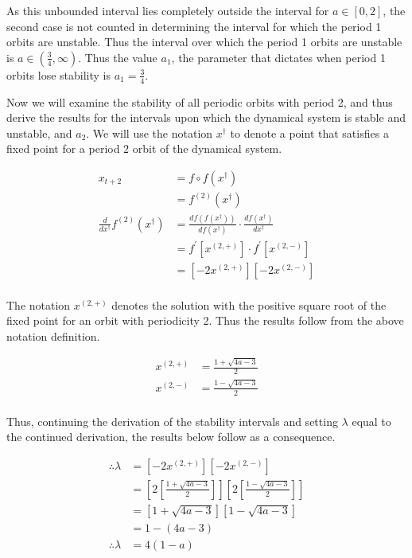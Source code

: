 \documentclass[a4paper]{article}
\begin{document}
\begin{enumerate}[label=\textbf{\arabic*.}]
\begin{enumerate}
		As this unbounded interval lies completely outside the interval for $\displaystyle{a \in [0,2]}$, the second case is not counted in determining the interval for which the period 1 orbits are unstable. Thus the interval over which the period 1 orbits are unstable is $\displaystyle{a \in \left(\frac{3}{4},\infty \right)}$. Thus the value $a_1$, the parameter that dictates when period 1 orbits lose stability is $a_1 = \frac{3}{4}$.

		\pagebreak

		Now we will examine the stability of all periodic orbits with period 2, and thus derive the results for the intervals upon which the dynamical system is stable and unstable, and $a_2$. We will use the notation $x^{\dagger}$ to denote a point that satisfies a fixed point for a period 2 orbit of the dynamical system.

		\begin{align*}
		x_{t+2} & = f\circ f(x^{\dagger})\\
		& = f^{(2)}(x^{\dagger})\\
		\frac{d}{dx^{\dagger}}f^{(2)}(x^{\dagger}) & = \frac{df(f(x^{\dagger}))}{df(x^{\dagger})}\cdot \frac{df(x^{\dagger})}{dx^{\dagger}}\\
		& = f^\prime \left[x^{(2,+)} \right] \cdot f^\prime \left[x^{(2,-)} \right]\\
		& = \left[-2x^{(2,+)} \right] \left[-2x^{(2,-)} \right]\\
		\end{align*}

		The notation $\displaystyle{x^{(2,+)}}$ denotes the solution with the positive square root of the fixed point for an orbit with periodicity 2. Thus the results follow from the above notation definition.

		\begin{align*}
		x^{(2,+)} & = \frac{1 + \sqrt{4a - 3}}{2}\\
		x^{(2,-)} & = \frac{1 - \sqrt{4a - 3}}{2}\\
		\end{align*}

		Thus, continuing the derivation of the stability intervals and setting $\lambda$ equal to the continued derivation, the results below follow as a consequence.

		\begin{align*}
		\therefore \lambda & = \left[-2x^{(2,+)} \right] \left[-2x^{(2,-)} \right]\\
		& = \left[2\left[\frac{1 + \sqrt{4a-3}}{2} \right] \right] \left[2\left[\frac{1 - \sqrt{4a-3}}{2} \right] \right]\\
		& = \left[1 + \sqrt{4a-3}\right] \left[1 - \sqrt{4a-3}\right]\\
		& = 1 - (4a - 3)\\
		\therefore \lambda & = 4(1-a)\\
		\end{align*}


\end{enumerate}
\end{enumerate}
\end{document}
